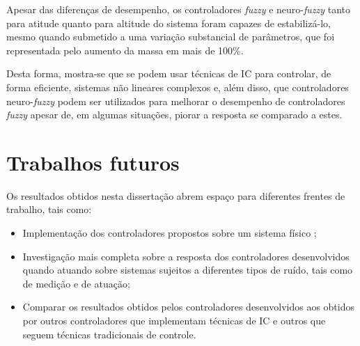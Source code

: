 Apesar das diferenças de desempenho, os controladores \textit{fuzzy} e neuro-\textit{fuzzy} tanto para atitude quanto para altitude do sistema foram capazes de estabilizá-lo, mesmo quando submetido a uma variação substancial de parâmetros, que foi representada pelo aumento da massa em mais de 100\%.

Desta forma, mostra-se que se podem usar técnicas de IC para controlar, de forma eficiente, sistemas não lineares complexos e, além disso, que controladores neuro-\textit{fuzzy} podem ser utilizados para melhorar o desempenho de controladores \textit{fuzzy} apesar de, em algumas situações, piorar a resposta se comparado a estes.

\section{Trabalhos futuros}
\label{sec:conclusao-trabalhosFuturos}

Os resultados obtidos nesta dissertação abrem espaço para diferentes frentes de trabalho, tais como:
\begin{itemize}
\item Implementação dos controladores propostos sobre um sistema físico ;
\item Investigação mais completa sobre a resposta dos controladores desenvolvidos quando atuando sobre sistemas sujeitos a diferentes tipos de ruído, tais como de medição e de atuação;
\item Comparar os resultados obtidos pelos controladores desenvolvidos aos obtidos por outros controladores que implementam técnicas de IC e  outros que seguem técnicas tradicionais de controle.
\end{itemize}


